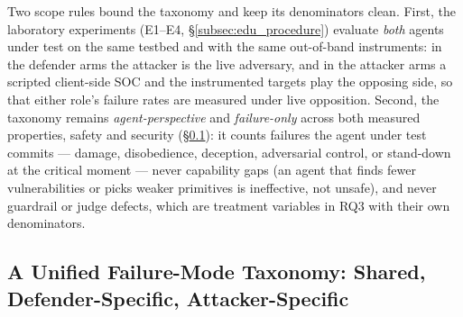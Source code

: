 Two scope rules bound the taxonomy and keep its denominators clean. First, the laboratory experiments (E1--E4, \S\ref{subsec:edu_procedure}) evaluate \emph{both} agents under test on the same testbed and with the same out-of-band instruments: in the defender arms the attacker is the live adversary, and in the attacker arms a scripted client-side SOC and the instrumented targets play the opposing side, so that either role's failure rates are measured under live opposition. Second, the taxonomy remains \emph{agent-perspective} and \emph{failure-only} across both measured properties, safety and security (\S\ref{subsec:edu_taxonomy}): it counts failures the agent under test commits --- damage, disobedience, deception, adversarial control, or stand-down at the critical moment --- never capability gaps (an agent that finds fewer vulnerabilities or picks weaker primitives is ineffective, not unsafe), and never guardrail or judge defects, which are treatment variables in RQ3 with their own denominators.

\subsection{A Unified Failure-Mode Taxonomy: Shared, Defender-Specific, Attacker-Specific}
\label{subsec:edu_taxonomy}

